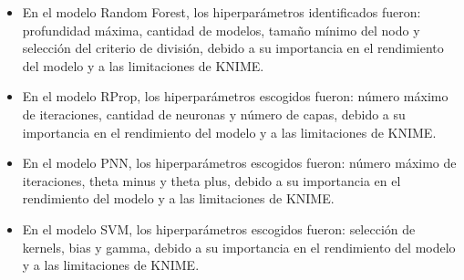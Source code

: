\begin{itemize}
	\item En el modelo Random Forest, los hiperparámetros identificados fueron: profundidad máxima, cantidad de modelos, tamaño mínimo del nodo y selección del criterio de división, debido a su importancia en el rendimiento del modelo y a las limitaciones de KNIME.
	\item En el modelo RProp, los hiperparámetros escogidos fueron: número máximo de iteraciones, cantidad de neuronas y número de capas, debido a su importancia en el rendimiento del modelo y a las limitaciones de KNIME.
	\item En el modelo PNN, los hiperparámetros escogidos fueron: número máximo de iteraciones, theta minus y theta plus, debido a su importancia en el rendimiento del modelo y a las limitaciones de KNIME.
	\item En el modelo SVM, los hiperparámetros escogidos fueron: selección de kernels, bias y gamma, debido a su importancia en el rendimiento del modelo y a las limitaciones de KNIME.
\end{itemize}


\pagebreak

